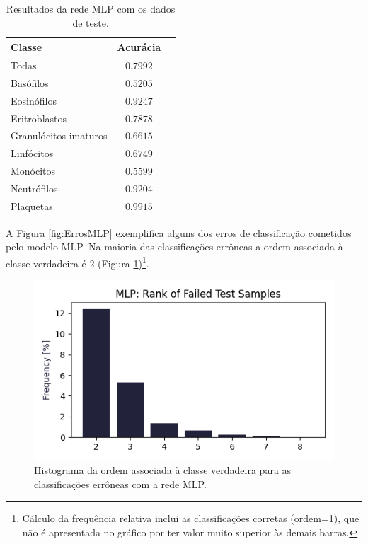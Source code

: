 \documentclass[final,5p]{elsarticle}
\numberwithin{equation}{section}
\begin{document}
    \begin{table}[h]
        \centering
        \begin{tabular}{l c c}
            \toprule
            \textbf{Classe} & \textbf{Acurácia} \\
            \midrule
            Todas & $0.7992$ \\
            \addlinespace
            Basófilos  & $0.5205$ \\
            Eosinófilos  & $0.9247$ \\
            Eritroblastos  & $0.7878$ \\
            Granulócitos imaturos  & $0.6615$ \\
            Linfócitos  & $0.6749$ \\
            Monócitos  & $0.5599$ \\
            Neutrófilos  & $0.9204$ \\
            Plaquetas  & $0.9915$ \\
            \bottomrule
        \end{tabular}
        \caption{Resultados da rede MLP com os dados de teste.}\label{tab:ResultadosMLP}
    \end{table}

    A Figura \ref{fig:ErrosMLP} exemplifica alguns dos erros de classificação cometidos pelo modelo MLP. Na maioria das classificações errôneas a ordem associada à classe verdadeira é 2 (Figura \ref{fig:HistogramaErrosMLP})\footnote{Cálculo da frequência relativa inclui as classificações corretas (ordem=1), que não é apresentada no gráfico por ter valor muito superior às demais barras.}.

    \begin{figure}[hbt!]
        \includegraphics[width=0.95\columnwidth]{MLP_rank.png}
        \caption{Histograma da ordem associada à classe verdadeira para as classificações errôneas com a rede MLP.}\label{fig:HistogramaErrosMLP}
    \end{figure}
\end{document}
